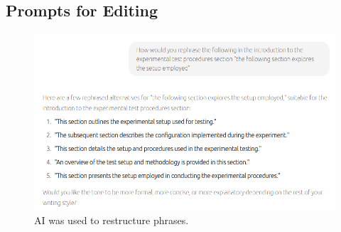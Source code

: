 \documentclass[class=report,11pt,crop=false]{standalone}
\begin{document}
	\subsection{Prompts for Editing}
	
	\begin{figure}[ht!]
		\centering
		\includegraphics[width=0.50\linewidth]{Figures/Appendices/editing}
		\caption{AI was used to restructure phrases.}
		\label{fig:prompts-editing}
	\end{figure} 
	
	
	\ifstandalone
	
	\printnoidxglossary[type=\acronymtype,nonumberlist]
	\fi
\end{document}
